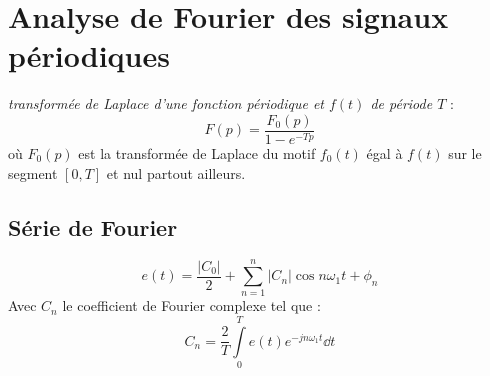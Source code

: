 \chapter[Analyse de Fourier]
{Analyse de Fourier des signaux périodiques\label{annexe-seriefourier}}
\emph{transformée de Laplace d'une fonction périodique et $f(t)$ de 
période $T$} :
\[
        F(p) = \dfrac{F_0(p)}{1-e^{-Tp}}
\]
où $F_0(p)$ est la transformée de Laplace du motif $f_0(t)$ égal à 
$f(t)$ sur le segment $[0,T]$ et nul partout ailleurs.
\section{Série de Fourier}
\[
    e(t)= \dfrac{|C_0|}{2}+\sum\limits_{n=1}^n |C_n|\cos{n\omega_1 t+\phi_n}
\]
Avec $C_n$ le coefficient de Fourier complexe tel que :
\[
    C_n=\dfrac{2}{T}\int\limits_0^T e(t)e^{-jn\omega_1 t}\dd{t}
\]
